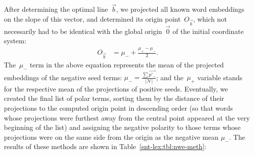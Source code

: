 After determining the optimal line~$\vec{b}$, we projected all known
word embeddings on the slope of this vector, and determined its origin
point~$O_{\vec{b}}$, which not necessarily had to be identical with
the global origin~$\vec{0}$ of the initial coordinate system:
{\small%
  \begin{align}
    O_{\vec{b}} &= \mu_- + \frac{\mu_+ - \mu_-}{2}.
\end{align}\normalsize}%
The~$\mu_-$ term in the above equation represents the mean of the
projected embeddings of the negative seed terms:
$\mu_- = \frac{\sum\vec{p'_-}}{|\mathcal{N}|}$; and the~$\mu_+$
variable stands for the respective mean of the projections of positive
seeds.  Eventually, we created the final list of polar terms, sorting
them by the distance of their projections to the computed origin point
in descending order (so that words whose projections were furthest
away from the central point appeared at the very beginning of the
list) and assigning the negative polarity to those terms whose
projections were on the same side from the origin as the negative mean
$\mu_-$.  The results of these methods are shown in
Table~\ref{snt-lex:tbl:nwe-meth}:

